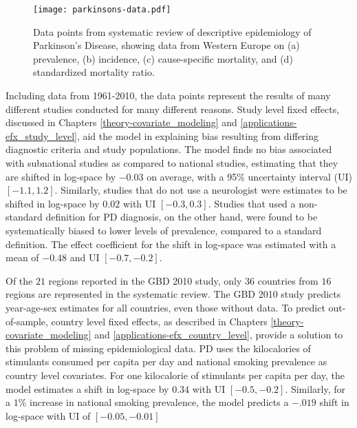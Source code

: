     \begin{figure}[h]
        \begin{center}
            \texttt{[image: parkinsons-data.pdf]}
            \caption{Data points from systematic review of descriptive
              epidemiology of Parkinson's Disease, showing data from
              Western Europe on (a) prevalence, (b) incidence, (c)
              cause-specific mortality, and (d) standardized mortality
              ratio.}
            \label{fig:intro-parkinsons data}
        \end{center}
    \end{figure}

Including data from 1961-2010, the data points represent the results
of many different studies conducted for many different reasons.  Study
level fixed effects, discussed in Chapters
\ref{theory-covariate_modeling} and
\ref{applications-efx_study_level}, aid the model in explaining bias
resulting from differing diagnostic criteria and study populations.
The model finds no bias associated with subnational studies as
compared to national studies, estimating that they are shifted in
log-space by $-0.03$ on average, with a 95\% uncertainty interval (UI)
$[-1.1, 1.2]$.  Similarly, studies that do not use a neurologist were
estimates to be shifted in log-space by $0.02$ with UI $[-0.3, 0.3]$.
Studies that used a non-standard definition for PD diagnosis, on the
other hand, were found to be systematically biased to lower levels of
prevalence, compared to a standard definition. The effect coefficient
for the shift in log-space was estimated with a mean of $-0.48$ and UI
$[-0.7, -0.2]$.

Of the $21$ regions reported in the GBD 2010 study, only $36$ countries
from $16$ regions are represented in the systematic review.  The GBD
2010 study predicts year-age-sex estimates for all countries, even
those without data.  To predict out-of-sample, country level fixed
effects, as described in Chapters \ref{theory-covariate_modeling} and
\ref{applications-efx_country_level}, provide a solution to this
problem of missing epidemiological data.  PD uses the
kilocalories of stimulants consumed per capita per day and national smoking prevalence
as country level covariates.  For one kilocalorie of stimulants per
capita per day, the model estimates a shift in log-space by $0.34$
with UI $[-0.5, -0.2]$.  Similarly, for a $1$\% increase in national
smoking prevalence, the model predicts a $-.019$ shift in log-space with UI
of $[-0.05, -0.01]$


